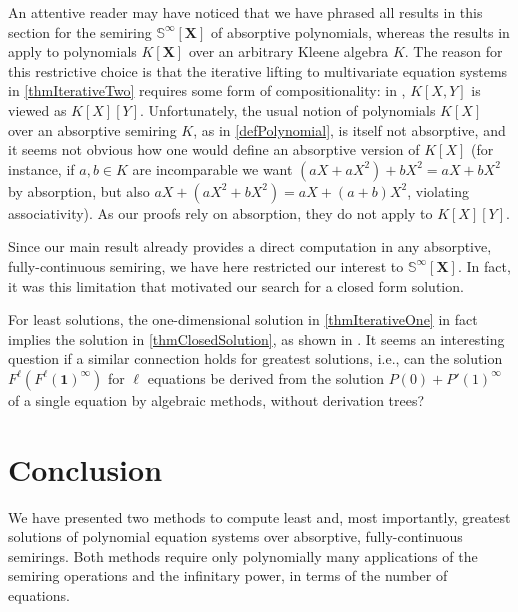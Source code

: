 \documentclass[english,runningheads,a4paper,envcountsame]{llncs}
\newcommand{\Sinf}{{\mathbb S}^{\infty}}
\newcommand*{\XX}{{\bm X}}
\newcommand{\one}{\tup 1}
\newcommand*{\tup}[1]{\mathbf{#1}}
\begin{document}
\begin{remark}
An attentive reader may have noticed that we have phrased all results in this section for the semiring $\Sinf[\XX]$ of absorptive polynomials, whereas the results in \cite{Kleene} apply to polynomials $K[\XX]$ over an arbitrary Kleene algebra $K$.
The reason for this restrictive choice is that the iterative lifting to multivariate equation systems in \cref{thmIterativeTwo} requires some form of compositionality:
in \cite{Kleene}, $K[X,Y]$ is viewed as $K[X][Y]$.
Unfortunately, the usual notion of polynomials $K[X]$ over an absorptive semiring $K$, as in \cref{defPolynomial}, is itself not absorptive, and it seems not obvious how one would define an absorptive version of $K[X]$ (for instance, if $a,b \in K$ are incomparable we want $(aX + aX^2) + bX^2 = aX + bX^2$ by absorption, but also $aX + (aX^2 + bX^2) = aX + (a+b)X^2$, violating associativity).
As our proofs rely on absorption, they do not apply to $K[X][Y]$.

Since our main result already provides a direct computation in any absorptive, fully-continuous semiring, we have here restricted our interest to $\Sinf[\XX]$.
In fact, it was this limitation that motivated our search for a closed form solution.
\end{remark}


\begin{remark}\label{remarkQuestion}
For least solutions, the one-dimensional solution in \cref{thmIterativeOne} in fact implies the solution in \cref{thmClosedSolution}, as shown in \cite[Prop.~28]{GGS19}.
It seems an interesting question if a similar connection holds for greatest solutions, i.e., can the solution $F^\ell(F^\ell(\one)^\infty)$ for $\ell$ equations be derived from the solution $P(0) + P'(1)^\infty$ of a single equation by algebraic methods, without derivation trees?
\end{remark}




\section{Conclusion}

We have presented two methods to compute least and, most importantly, greatest solutions of polynomial equation systems over absorptive, fully-continuous semirings.
Both methods require only polynomially many applications of the semiring operations and the infinitary power, in terms of the number of equations.
\end{document}
